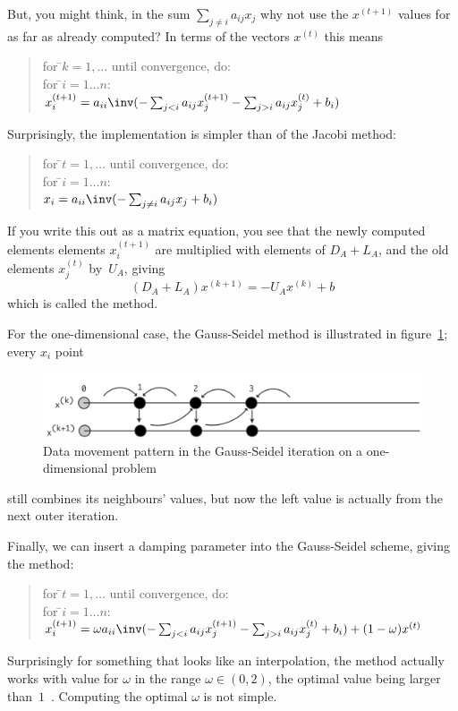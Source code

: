But, you might think, in the sum $\sum_{j\not=i} a_{ij}x_j$ why
not use the $x^{(t+1)}$ values for as far as already computed?
In terms of the vectors $x^{(t)}$ this means
\begin{quote}
  \begin{tabbing}
    for \=$k=1,\ldots$ until convergence, do:\\
    \>for \=$i=1\ldots n$:\\
    \>\>$x^{(t+1)}_i = a_{ii}\inv (-\sum_{j<i} a_{ij}x_j^{(t+1)} -
                      \sum_{j>i} a_{ij}x_j^{(t)}+b_i)$\\
  \end{tabbing}
\end{quote}
Surprisingly, the implementation is simpler than of the Jacobi method:
\begin{quote}
  \begin{tabbing}
    for \=$t=1,\ldots$ until convergence, do:\\
    \>for \=$i=1\ldots n$:\\
    \>\>$x_i = a_{ii}\inv (-\sum_{j\not=i} a_{ij}x_j +b_i)$\\
  \end{tabbing}
\end{quote}
If you write this out as a matrix equation, you see that
the newly computed elements elements $x^{(t+1)}_i$ are 
multiplied with elements of $D_A+L_A$,
and the old elements $x^{(t)}_j$ by~$U_A$, giving
\[ (D_A+L_A)x^{(k+1)}=-U_Ax^{(k)}+b \]
which is called the  method.

For the one-dimensional case, the Gauss-Seidel method
is illustrated in figure~\ref{fig:1d-sor}; every $x_i$ point
\begin{figure}[ht]
  \includegraphics[scale=.08]{graphics/sor}
  \caption{Data movement pattern in the Gauss-Seidel iteration on a
    one-dimensional problem}
  \label{fig:1d-sor}
\end{figure}
still combines its neighbours' values, but now the left value is
actually from the next outer iteration.

Finally, we can insert a damping parameter into the Gauss-Seidel
scheme, giving the  method:
\begin{quote}
  \begin{tabbing}
    for \=$t=1,\ldots$ until convergence, do:\\
    \>for \=$i=1\ldots n$:\\
    \>\>$x^{(t+1)}_i = \omega a_{ii}\inv (-\sum_{j<i} a_{ij}x_j^{(t+1)} -
                      \sum_{j>i} a_{ij}x_j^{(t)} + b_i)
        +(1-\omega)x^{(t)}$\\
  \end{tabbing}
\end{quote}
Surprisingly for something that looks like an interpolation, the
method actually works with value for $\omega$ in the range
$\omega\in(0,2)$, the optimal value being larger
than~$1$~\cite{HaYo:applied}. Computing the optimal $\omega$ is not
simple.

